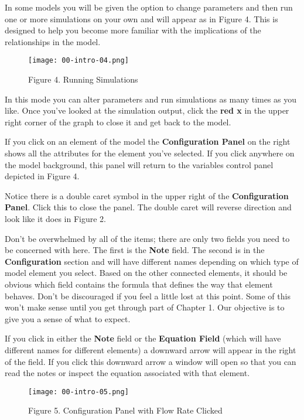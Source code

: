 \documentclass[]{memoir}
\let\Oldincludegraphics\includegraphics
\renewcommand{\includegraphics}[1]{\Oldincludegraphics[max size={\textwidth}{\textheight}]{#1}}
\begin{document}
In some models you will be given the option to change parameters and
then run one or more simulations on your own and will appear as in
Figure 4. This is designed to help you become more familiar with the
implications of the relationships in the model.

\begin{figure}[htbp]
\centering
\texttt{[image: 00-intro-04.png]}
\caption{Figure 4. Running Simulations}
\end{figure}

In this mode you can alter parameters and run simulations as many times
as you like. Once you've looked at the simulation output, click the
\textbf{red x} in the upper right corner of the graph to close it and
get back to the model.

If you click on an element of the model the \textbf{Configuration Panel}
on the right shows all the attributes for the element you've selected.
If you click anywhere on the model background, this panel will return to
the variables control panel depicted in Figure 4.

Notice there is a double caret symbol in the upper right of the
\textbf{Configuration Panel}. Click this to close the panel. The double
caret will reverse direction and look like it does in Figure 2.

Don't be overwhelmed by all of the items; there are only two fields you
need to be concerned with here. The first is the \textbf{Note} field.
The second is in the \textbf{Configuration} section and will have
different names depending on which type of model element you select.
Based on the other connected elements, it should be obvious which field
contains the formula that defines the way that element behaves. Don't be
discouraged if you feel a little lost at this point. Some of this won't
make sense until you get through part of Chapter 1. Our objective is to
give you a sense of what to expect.

If you click in either the \textbf{Note} field or the \textbf{Equation
Field} (which will have different names for different elements) a
downward arrow will appear in the right of the field. If you click this
downward arrow a window will open so that you can read the notes or
inspect the equation associated with that element.

\begin{figure}[htbp]
\centering
\texttt{[image: 00-intro-05.png]}
\caption{Figure 5. Configuration Panel with Flow Rate Clicked}
\end{figure}
\end{document}
